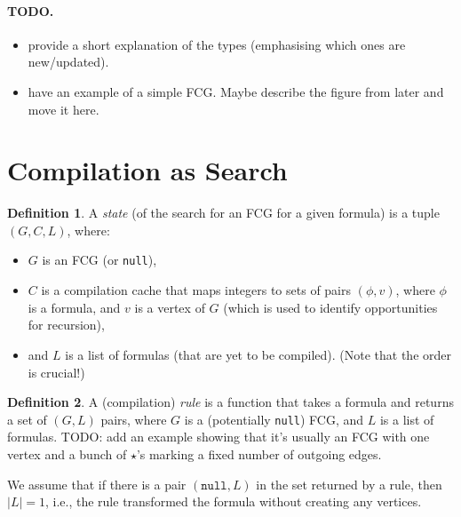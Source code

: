 \documentclass{article}
\theoremstyle{definition}
\newtheorem{definition}{Definition}
\theoremstyle{remark}
\begin{document}
\paragraph{TODO.}
\begin{itemize}
\item provide a short explanation of the types (emphasising which ones are new/updated). %
\item have an example of a simple FCG. Maybe describe the figure from later and move it here.
\end{itemize}

\section{Compilation as Search}

\begin{definition}
  A \emph{state} (of the search for an FCG for a given formula) is a tuple $(G, C, L)$, where:
  \begin{itemize}
  \item $G$ is an FCG (or \texttt{null}),
  \item $C$ is a compilation cache that maps integers to sets of pairs $(\phi, v)$, where $\phi$ is a formula, and $v$ is a vertex of $G$ (which is used to identify opportunities for recursion),
  \item and $L$ is a list of formulas (that are yet to be compiled). (Note that the order is crucial!)
  \end{itemize}
\end{definition}

\begin{definition}
  A (compilation) \emph{rule} is a function that takes a formula and returns a set of $(G, L)$ pairs, where $G$ is a (potentially \texttt{null}) FCG, and $L$ is a list of formulas. TODO: add an example showing that it's usually an FCG with one vertex and a bunch of $\star$'s marking a fixed number of outgoing edges.
\end{definition}

We assume that if there is a pair $(\texttt{null}, L)$ in the set returned by a rule, then $|L| = 1$, i.e., the rule transformed the formula without creating any vertices.
\end{document}
